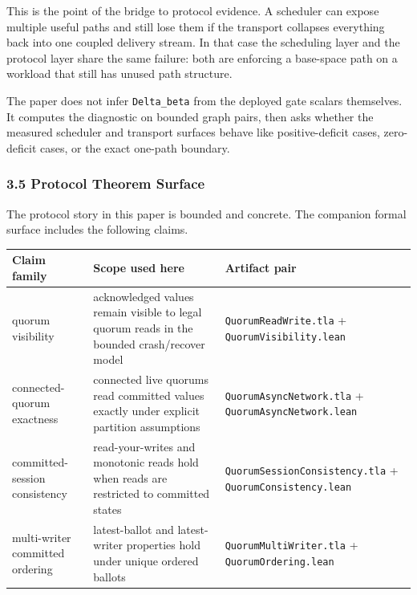 \documentclass[
  11pt,
]{article}
\newcounter{none} %
\begin{document}
This is the point of the bridge to protocol evidence. A scheduler can
expose multiple useful paths and still lose them if the transport
collapses everything back into one coupled delivery stream. In that case
the scheduling layer and the protocol layer share the same failure: both
are enforcing a base-space path on a workload that still has unused path
structure.

The paper does not infer \texttt{Delta\_beta} from the deployed gate
scalars themselves. It computes the diagnostic on bounded graph pairs,
then asks whether the measured scheduler and transport surfaces behave
like positive-deficit cases, zero-deficit cases, or the exact one-path
boundary.

\subsubsection{3.5 Protocol Theorem
Surface}\label{protocol-theorem-surface}

The protocol story in this paper is bounded and concrete. The companion
formal surface includes the following claims.

{\def\LTcaptype{none} %
\begin{longtable}[]{@{}
  >{\raggedright\arraybackslash}p{}
  >{\raggedright\arraybackslash}p{}
  >{\raggedright\arraybackslash}p{}@{}}
\toprule\noalign{}
\begin{minipage}[b]{\linewidth}\raggedright
Claim family
\end{minipage} & \begin{minipage}[b]{\linewidth}\raggedright
Scope used here
\end{minipage} & \begin{minipage}[b]{\linewidth}\raggedright
Artifact pair
\end{minipage} \\
\midrule\noalign{}
\endhead
\bottomrule\noalign{}
\endlastfoot
quorum visibility & acknowledged values remain visible to legal quorum
reads in the bounded crash/recover model & \texttt{QuorumReadWrite.tla}
+ \texttt{QuorumVisibility.lean} \\
connected-quorum exactness & connected live quorums read committed
values exactly under explicit partition assumptions &
\texttt{QuorumAsyncNetwork.tla} + \texttt{QuorumAsyncNetwork.lean} \\
committed-session consistency & read-your-writes and monotonic reads
hold when reads are restricted to committed states &
\texttt{QuorumSessionConsistency.tla} +
\texttt{QuorumConsistency.lean} \\
multi-writer committed ordering & latest-ballot and latest-writer
properties hold under unique ordered ballots &
\texttt{QuorumMultiWriter.tla} + \texttt{QuorumOrdering.lean} \\
\end{longtable}
}
\end{document}
